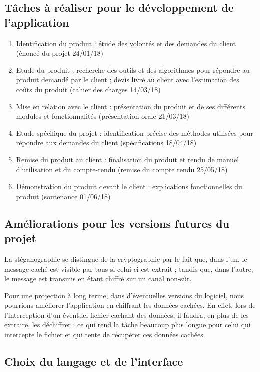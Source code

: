 \documentclass[11pt]{article}
\begin{document}
\subsection{Tâches à réaliser pour le développement de l'application}
\begin {enumerate}
\item Identification du produit : étude des volontés et des demandes du client (énoncé du projet 24/01/18)
\item Etude du produit : recherche des outils et des algorithmes pour répondre au produit demandé par le client ; 
devis livré au client avec l'estimation des coûts du produit (cahier des charges 14/03/18)
\item Mise en relation avec le client : présentation du produit et de ses différents modules et fonctionnalités (présentation orale 21/03/18)
\item Etude spécifique du projet : identification précise des méthodes utilisées pour répondre aux demandes du client (spécifications 18/04/18)
\item Remise du produit au client : finalisation du produit et rendu de manuel d'utilisation et du compte-rendu (remise du compte rendu 25/05/18)
\item Démonstration du produit devant le client : explications fonctionnelles du produit (soutenance 01/06/18)
\end{enumerate}

\subsection{Améliorations pour les versions futures du projet}
La stéganographie se distingue de la cryptographie par le fait que, dans l'un, le message caché est visible par tous si celui-ci est extrait ; tandis que, dans l'autre, 
le message est transmis en étant chiffré sur un canal non-sûr. 

Pour une projection à long terme, dans d'éventuelles versions du logiciel, nous pourrions améliorer l'application en chiffrant les données cachées. 
En effet, lors de l'interception d'un éventuel fichier cachant des données, il faudra, en plus de les extraire, les déchiffrer : ce qui rend la tâche beaucoup plus longue
pour celui qui intercepte le fichier et qui tente de récupérer ces données cachées. 

\subsection{Choix du langage et de l'interface}
\end{document}
